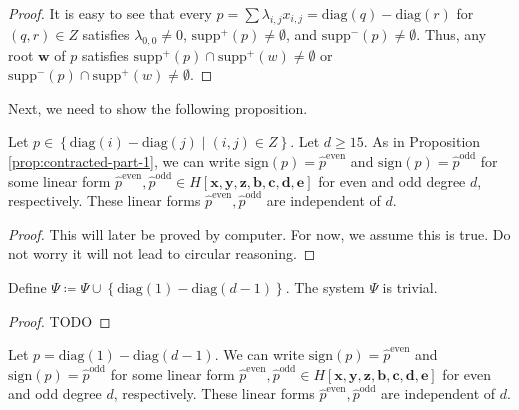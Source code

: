 \begin{proof}
    It is easy to see that every \( p = \sum \lambda_{i,j} x_{i,j} = \mathrm{diag}(q) - \mathrm{diag}(r) \) for \( (q,r) \in Z \) satisfies \( \lambda_{0,0} \neq 0 \), \( \mathrm{supp}^+(p) \neq \emptyset \), and \( \mathrm{supp}^-(p) \neq \emptyset \). Thus, any root \( \mathbf{w} \) of \( p \) satisfies \( \mathrm{supp}^+(p) \cap \mathrm{supp}^+(w) \neq \emptyset \) or \( \mathrm{supp}^-(p) \cap \mathrm{supp}^+(w) \neq \emptyset \).
\end{proof}

Next, we need to show the following proposition.

\begin{proposition}
    Let \( p \in \left\{ \mathrm{diag}(i) - \mathrm{diag}(j) \mid (i,j) \in Z \right\} \). Let \( d \geq 15 \). As in Proposition \ref{prop:contracted-part-1}, we can write \( \mathrm{sign}(p) = \hat p^{\mathrm{even}} \) and  \( \mathrm{sign}(p) = \hat p^{\mathrm{odd}} \) for some linear form \( \hat p^{\mathrm{even}}, \hat p^{\mathrm{odd}} \in H[\mathbf{x}, \mathbf{y}, \mathbf{z}, \mathbf{b}, \mathbf{c}, \mathbf{d}, \mathbf{e}] \) for even and odd degree \( d \), respectively. These linear forms \(  \hat p^{\mathrm{even}}, \hat p^{\mathrm{odd}} \) are independent of \( d \).
\end{proposition}

\begin{proof}
    This will later be proved by computer. For now, we assume this is true. Do not worry it will not lead to circular reasoning.
\end{proof}

\begin{proposition}
    Define \( \Psi \coloneqq \Psi \cup \left\{ \mathrm{diag}(1) - \mathrm{diag}(d-1) \right\}\). The system \( \Psi \) is trivial.
\end{proposition}

\begin{proof}
    TODO
\end{proof}

\begin{proposition}
    Let \( p = \mathrm{diag}(1) - \mathrm{diag}(d-1)\). We can write \( \mathrm{sign}(p) = \hat p^{\mathrm{even}} \) and  \( \mathrm{sign}(p) = \hat p^{\mathrm{odd}} \) for some linear form \( \hat p^{\mathrm{even}}, \hat p^{\mathrm{odd}} \in H[\mathbf{x}, \mathbf{y}, \mathbf{z}, \mathbf{b}, \mathbf{c}, \mathbf{d}, \mathbf{e}] \) for even and odd degree \( d \), respectively. These linear forms \(  \hat p^{\mathrm{even}}, \hat p^{\mathrm{odd}} \) are independent of \( d \).
\end{proposition}

